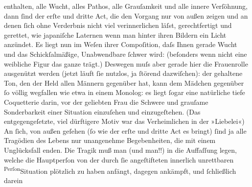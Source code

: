 \begin{ledgroupsized}[t]{13cm}
                    enthalten, alle Wucht, alles Pathos, alle Grauſamkeit und alle innere Verſöhnung, dann ſind der erſte und
                    dritte Act, die den Vorgang nur von außen zeigen und an denen ſich ohne
                    Verderbnis nicht viel verinnerlichen läſst, gerechtfertigt und gerettet, wie
                        japaniſche Laternen wenn man hinter ihren Bildern ein Licht anzündet. Es liegt
                        {\pb}nun im Weſen ihrer
                    Compoſition, daſs Ihnen gerade Wucht und das Schickſalmäßige, Unabwendbare
                    ſchwer wird: (beſonders wenn nicht eine weibliche Figur das ganze trägt.)
                    Deswegen muſs aber gerade hier die Frauenrolle ausgenützt werden (jetzt läuft
                    ſie nutzlos, ja ſtörend dazwiſchen): der gehaltene Ton, den der Held allen
                    Männern gegenüber hat, kann dem Mädchen gegenüber ſo völlig wegfallen wie etwa
                    in einem Monolog: es liegt ſogar eine natürliche tiefe Coquetterie darin, {\pb}vor der geliebten Frau die
                    Schwere und grauſame Sonderbarkeit einer Situation einzuſehen und einzugeſtehen.
                    (Das entgegengeſetzte, viel dürftigere Motiv war das Verheimlichen in der
                        »Liebelei«)\pend
           \pstart
           An ſich, von außen geſehen (ſo wie der erſte
                    und dritte Act es bringt) ſind ja alle
                    Tragödien des Lebens nur unangenehme Begebenheiten, die mit einem Unglücksfall
                    enden. Die Tragik muß man (und  man!!) in
                    die Auffaſſung legen, welche die Hauptperſon von der durch ſie angeſtifteten {\pb}innerlich unrettbaren \substVorne{}\textsuperscript{Perſon}{\allowbreak}\substDazwischen{}Situation\substHinten{} plötzlich zu haben anfängt, dagegen ankämpft, und ſchließlich darein

\end{ledgroupsized}

